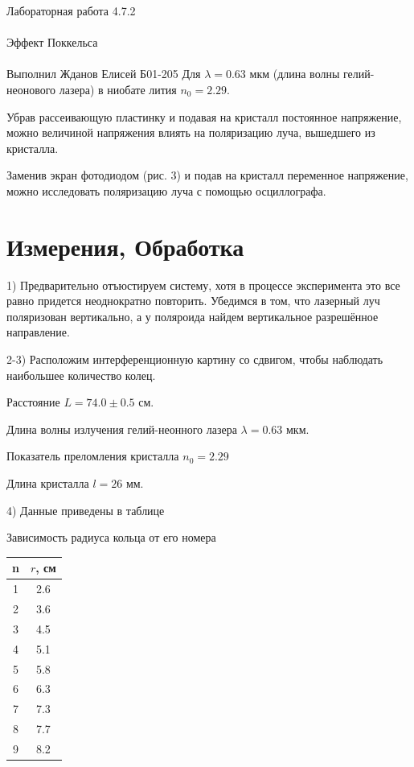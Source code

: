 \documentclass{astroedu-lab}
\begin{document}
\begin{problem}{\huge Лабораторная работа 4.7.2\\\\Эффект Поккельса\\\\Выполнил Жданов Елисей Б01-205}
Для $\lambda = 0.63$ мкм (длина волны гелий-неонового лазера) в ниобате лития $n_0 = 2.29$.

Убрав рассеивающую пластинку и подавая на кристалл постоянное напряжение, можно величиной напряжения влиять на поляризацию луча, вышедшего из кристалла.

Заменив экран фотодиодом (рис. 3) и подав на кристалл переменное напряжение, можно исследовать поляризацию луча с помощью осциллографа.

\section{Измерения, Обработка}

1) Предварительно отъюстируем систему, хотя в процессе эксперимента это все равно придется неоднократно повторить. Убедимся в том, что лазерный луч поляризован вертикально, а у поляроида найдем вертикальное разрешённое направление.

2-3) Расположим интерференционную картину со сдвигом, чтобы наблюдать наибольшее количество колец.

Расстояние $L = 74.0 \pm 0.5$ см.

Длина волны излучения гелий-неонного лазера $\lambda = 0.63$ мкм.

Показатель преломления кристалла $n_0 = 2.29$

Длина кристалла $l = 26$ мм.

4) Данные приведены в таблице

\begin{center}
	\Large Зависимость радиуса кольца от его номера
\end{center}

\begin{center}
\begin{tabular}{|c|c|}
\hline 
n & $r$, см \\
\hline 
1 &	2.6 \\
2 &	3.6 \\
3 &	4.5 \\
4 &	5.1 \\
5 &	5.8 \\
6 &	6.3 \\
7 &	7.3 \\
8 &	7.7 \\
9 &	8.2 \\
\hline

\hline
\end{tabular}
\end{center}


\end{problem}
\end{document}
